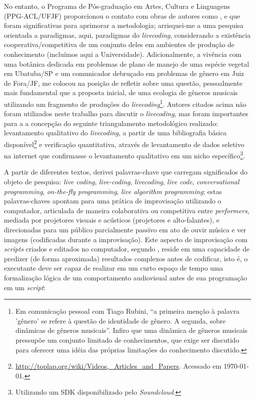 No entanto, o Programa de Pós-graduação em Artes, Cultura e Linguagens  (PPG-ACL/UFJF) proporcionou o contato com obras  de autores como ,  e  que foram significativas para aprimorar a metodologia; arrisquei-me a uma pesquisa orientada a paradigmas, aqui, paradigmas do \emph{livecoding}, considerando a existência cooperativa/competitiva de um conjunto deles em ambientes de produção de conhecimento (incluímos aqui a Universidade). Adicionalmente, a vivência com uma botânica dedicada em problemas de plano de manejo de uma espécie vegetal em Ubatuba/SP e um comunicador debruçado em problemas de gênero em Juiz de Fora/JF, me colocou na posição de refletir sobre uma questão, pessoalmente mais fundamental que a proposta inicial, de uma ecologia de gêneros musicais utilizando um fragmento de produções do \emph{livecoding}\footnote{Em comunicação pessoal com Tiago Rubini, ``a primeira menção à palavra 'gênero' se refere à questão de identidade de gênero. A segunda, sobre dinâmicas de gêneros musicais''. Infiro que uma dinâmica de gêneros musicais pressupõe um conjunto limitado de conhecimentos, que exige ser discutido para oferecer uma idéia das próprias limitações do conhecimento discutido.}. Autores citados acima não foram utilizados neste trabalho para discutir o \emph{livecoding}, mas foram importantes para a a concepção do seguinte triangulamento metodológico realizado: levantamento qualitativo do \emph{livecoding}, a partir de uma bibliografia básica disponível\footnote{\url{http://toplap.org/wiki/Videos,_Articles_and_Papers}. Acessado em \today.} e verificação quantitativa, através de levantamento de dados seletivo na internet que confirmasse o levantamento qualitativo em um nicho específico\footnote{Utilizando um SDK disponibilizado pelo \emph{Soundcloud}.}.


A partir de diferentes textos, derivei palavras-chave que carregam significados do objeto de pesquisa: \emph{live coding}, \emph{live-coding}, \emph{livecoding}, \emph{live code}, \emph{conversational programming}, \emph{on-the-fly programming}, \emph{live algorithm programming}; estas palavras-chaves apontam para uma prática de improvisação utilizando o computador, articulada de maneira colaborativa ou competitiva entre \emph{performers}, mediada por projetores visuais e acústicos (projetores e alto-falantes), e direcionadas para um público parcialmente passivo em ato de ouvir música e ver imagens (codificadas durante a improvisação). Este aspecto de improvisação com \emph{scripts} criados e editados no computador, segundo , reside em uma capacidade de predizer (de forma aproximada) resultados complexos antes de codificar, isto é, o  executante deve ser capaz de realizar em um curto espaço de tempo uma formalização lógica de um comportamento audiovisual antes de sua programação em um \emph{script}: 

